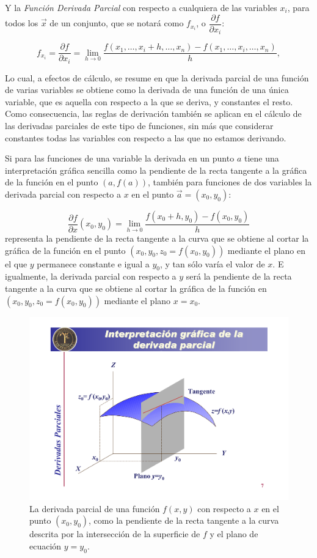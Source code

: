 Y la \emph{Función Derivada Parcial} con respecto a cualquiera de
las variables $x_i$, para todos los $\vec{x}$ de un conjunto, que se
notará como $f_{x_i}$, o $\dfrac{\partial f}{\partial x_i}$:

\[
f_{x_i}=\dfrac{\partial f}{\partial x_i}=\lim_{h\rightarrow
0}\frac{f(x_1,\ldots,x_i+h,\ldots,x_n)-f(x_1,\ldots,x_i,\ldots,x_n)}{h},
\]

Lo cual, a efectos de cálculo, se resume en que la derivada parcial
de una función de varias variables se obtiene como la derivada de
una función de una única variable, que es aquella con respecto a la
que se deriva, y constantes el resto. Como consecuencia, las reglas
de derivación también se aplican en el cálculo de las derivadas
parciales de este tipo de funciones, sin más que considerar
constantes todas las variables con respecto a las que no estamos
derivando.

Si para las funciones de una variable la derivada en un punto $a$
tiene una interpretación gráfica sencilla como la pendiente de la
recta tangente a la gráfica de la función en el punto $(a,f(a))$,
también para funciones de dos variables la derivada parcial con
respecto a $x$ en el punto $\vec{a}=(x_0,y_0)$:

\[
\frac{{\partial f}} {{\partial x}}(x_0 ,y_0 ) = \mathop {\lim
}\limits_{h \to 0} \frac{{f(x_0  + h,y_0 ) - f(x_0 ,y_0 )}} {h}
\]
representa la pendiente de la recta tangente a la curva que se
obtiene al cortar la gráfica de la función en el punto
$(x_0,y_0,z_0=f(x_0,y_0))$ mediante el plano en el que $y$ permanece
constante e igual a $y_0$, y tan sólo varía el valor de $x$. E
igualmente, la derivada parcial con respecto a $y$ será la pendiente
de la recta tangente a la curva que se obtiene al cortar la gráfica
de la función en $(x_0,y_0,z_0=f(x_0,y_0))$ mediante el plano
$x=x_0$.

\begin{figure}[h!]
\begin{center}
\includegraphics[scale=0.4]{img/derivadas_varias_variables/tangentesuperficie}
\caption{La derivada parcial de una función $f(x,y)$ con respecto a
$x$ en el punto $(x_0,y_0)$, como la pendiente de la recta tangente
a la curva descrita por la intersección de la superficie de $f$ y el
plano de ecuación $y=y_0$.}
\end{center}
\end{figure}


